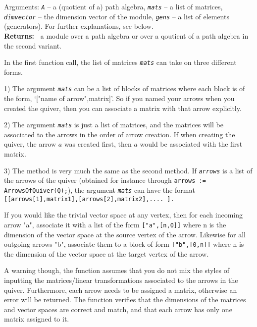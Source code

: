 \documentclass[a4paper,11pt]{report}
\begin{document}
{{{ Arguments: \mbox{\texttt{\slshape A}} -- a (quotient of a) path algebra, \mbox{\texttt{\slshape mats}} -- a list of matrices, \mbox{\texttt{\slshape dim{\textunderscore}vector}} -- the dimension vector of the module, \mbox{\texttt{\slshape gens}} -- a list of elements (generators). For further explanations, see below. \\
\textbf{\indent Returns:\ }
a module over a path algebra or over a qoutient of a path algebra in the
second variant.



 In the first function call, the list of matrices \mbox{\texttt{\slshape mats}} can take on three different forms.

 1) The argument \mbox{\texttt{\slshape mats}} can be a list of blocks of matrices where each block is of the form, `["name
of arrow",matrix]'. So if you named your arrows when you created the quiver,
then you can associate a matrix with that arrow explicitly.

 2) The argument \mbox{\texttt{\slshape mats}} is just a list of matrices, and the matrices will be associated to the arrows
in the order of arrow creation. If when creating the quiver, the arrow $a$ was created first, then $a$ would be associated with the first matrix.

 3) The method is very much the same as the second method. If \mbox{\texttt{\slshape arrows}} is a list of the arrows of the quiver (obtained for instance through \texttt{arrows := ArrowsOfQuiver(Q);}), the argument \mbox{\texttt{\slshape mats}} can have the format \texttt{[[arrows[1],matrix{\textunderscore}1],[arrows[2],matrix{\textunderscore}2],....
].}

 If you would like the trivial vector space at any vertex, then for each
incoming arrow "a", associate it with a list of the form \texttt{["a",[n,0]]} where n is the dimension of the vector space at the source vertex of the
arrow. Likewise for all outgoing arrows "b", associate them to a block of form \texttt{["b",[0,n]]} where n is the dimension of the vector space at the target vertex of the
arrow.

 A warning though, the function assumes that you do not mix the styles of
inputting the matrices/linear transformations associated to the arrows in the
quiver. Furthermore, each arrow needs to be assigned a matrix, otherwise an
error will be returned. The function verifies that the dimensions of the
matrices and vector spaces are correct and match, and that each arrow has only
one matrix assigned to it.

}}}
\end{document}
